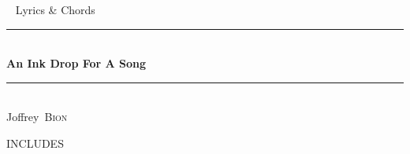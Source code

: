 \documentclass[a4paper,11pt,french]{article}
\newcommand*{\HRule}{\rule{\linewidth}{0.4mm}}  %
\newcommand*{\auteur}[2]{\large #1~\textsc{#2}} %
\newcommand{\pretitre}{Lyrics \& Chords}
\newcommand{\grostitre}{An Ink Drop For A Song}
\newcommand{\auteurs}{\auteur{Joffrey}{Bion}}
\newcommand{\madate}{\the\year} %
\begin{document}

\begin{titlepage}
  \begin{center}
    ~
    \vfill
    {\LARGE\pretitre\\}           %
    \vspace{2cm}
    \HRule \\[0.4cm]
    {\Huge\bf\grostitre\\[0.4cm]} %
    \HRule \\[0.4cm]
    \vspace{2cm}
    \auteurs\\                    %
    \vfill
    \vfill
    {\large\madate}               %
  \end{center}
\end{titlepage}






{{INCLUDES}}

\printindex

\end{document}

